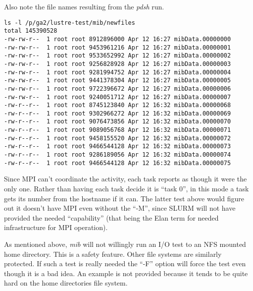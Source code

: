 \documentclass{article}
\begin{document}
\pagebreak
Also note the file names resulting from the {\em pdsh} run.
{\small
  \begin{verbatim}
ls -l /p/ga2/lustre-test/mib/newfiles
total 145390528
-rw-rw-r--  1 root root 8912896000 Apr 12 16:27 mibData.00000000
-rw-rw-r--  1 root root 9453961216 Apr 12 16:27 mibData.00000001
-rw-rw-r--  1 root root 9533652992 Apr 12 16:27 mibData.00000002
-rw-rw-r--  1 root root 9256828928 Apr 12 16:27 mibData.00000003
-rw-rw-r--  1 root root 9281994752 Apr 12 16:27 mibData.00000004
-rw-rw-r--  1 root root 9441378304 Apr 12 16:27 mibData.00000005
-rw-rw-r--  1 root root 9722396672 Apr 12 16:27 mibData.00000006
-rw-rw-r--  1 root root 9240051712 Apr 12 16:27 mibData.00000007
-rw-r--r--  1 root root 8745123840 Apr 12 16:32 mibData.00000068
-rw-r--r--  1 root root 9302966272 Apr 12 16:32 mibData.00000069
-rw-r--r--  1 root root 9076473856 Apr 12 16:32 mibData.00000070
-rw-r--r--  1 root root 9089056768 Apr 12 16:32 mibData.00000071
-rw-r--r--  1 root root 9458155520 Apr 12 16:32 mibData.00000072
-rw-r--r--  1 root root 9466544128 Apr 12 16:32 mibData.00000073
-rw-r--r--  1 root root 9286189056 Apr 12 16:32 mibData.00000074
-rw-r--r--  1 root root 9466544128 Apr 12 16:32 mibData.00000075
  \end{verbatim}
}

Since MPI can't coordinate the activity, each task reports as though
it were the only one.  Rather than having each task decide it is
``task 0'', in this mode a task gets its number from the hostname if
it can.  The latter test above would figure out it doesn't have MPI
even without the ``-M'', since SLURM will not have provided the needed
``capability'' (that being the Elan term for needed infrastructure for
MPI operation). 

As mentioned above, {\em mib} will not willingly run an I/O test to an NFS
mounted home directory.  This is a safety feature.  Other file systems
are similarly protected.  If such a test is really needed the ``-F''
option will force the test even though it is a bad idea.  An example
is not provided because it tends to be quite hard on the home
directories file system.  
\end{document}

